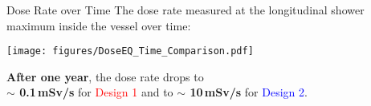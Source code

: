 \documentclass[xcolor={dvipsnames}]{beamer}
\begin{document}
\begin{frame}{Dose Rate over Time}
The dose rate measured at the longitudinal shower maximum inside the vessel over time:
\begin{center}
  \texttt{[image: figures/DoseEQ\_Time\_Comparison.pdf]}
\end{center}
\textbf{After one year}, the dose rate drops to \\\textbf{$\sim$ 0.1\,mSv/s} for \textcolor{Red}{Design 1} and to \textbf{$\sim$ 10\,mSv/s} for \textcolor{Blue}{Design 2}.
\end{frame}

\end{document}
